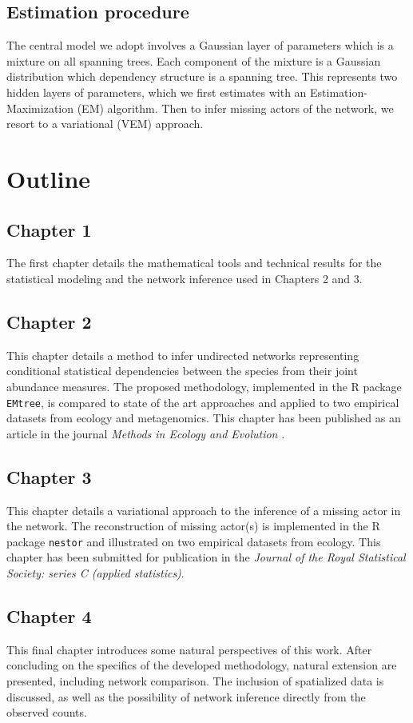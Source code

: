  
 \subsection*{Estimation procedure} %
The central model we adopt involves a Gaussian layer of parameters which is a mixture on all spanning trees. Each component of the mixture is a Gaussian distribution which dependency structure is a spanning tree. This represents two hidden layers of parameters, which we first estimates with an Estimation-Maximization (EM) algorithm. Then to infer missing actors of the network, we resort to a variational (VEM) approach.

\section*{Outline} 
  \subsection*{Chapter 1}
The first chapter details the mathematical tools and technical results for the statistical modeling and the network inference used in Chapters 2 and 3.

   \subsection*{Chapter 2}
   This chapter details a method to infer undirected networks representing conditional statistical dependencies between the species from their joint abundance measures.  The proposed methodology, implemented in the R package \texttt{EMtree},  is compared to state of the art approaches and applied to two empirical datasets from ecology and metagenomics. This chapter has been published as an article in the journal \textit{Methods in Ecology and Evolution} \citep{MRA20}.
   
    \subsection*{Chapter 3}
This chapter details a variational approach to the inference of a missing actor in the network. The reconstruction of missing actor(s) is implemented in the R package \texttt{nestor} and illustrated on two  empirical datasets from ecology. This chapter has been submitted for publication in the \textit{Journal of the Royal Statistical Society: series C (applied statistics)}.
 
  \subsection*{Chapter 4}
This final chapter introduces some natural perspectives of this work. After concluding on the specifics of the developed methodology, natural extension are presented, including network comparison. The inclusion of spatialized data is discussed, as well as the possibility of network inference directly from the observed counts.
